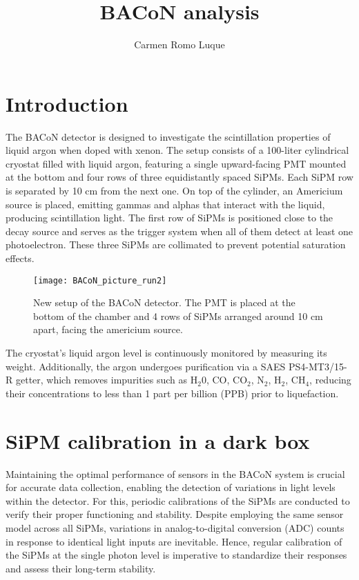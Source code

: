 \documentclass[11pt,a4paper,english,oneside, pdf]{article}
\title{BACoN analysis}
\author{Carmen Romo Luque}
\begin{document}
	\maketitle
	
	\section{Introduction}	 
	 The BACoN detector is designed to investigate the scintillation properties of liquid argon when doped with xenon. The setup consists of a 100-liter cylindrical cryostat filled with liquid argon, featuring a single upward-facing PMT mounted at the bottom and four rows of three equidistantly spaced SiPMs. Each SiPM row is separated by 10 cm from the next one. On top of the cylinder, an Americium source is placed, emitting gammas and alphas that interact with the liquid, producing scintillation light. The first row of SiPMs is positioned close to the decay source and serves as the trigger system when all of them detect at least one photoelectron. These three SiPMs are collimated to prevent potential saturation effects.
	 
	 	\begin{figure}[!h]
	 	\begin{center}
	 		\texttt{[image: BACoN\_picture\_run2]}
	 		\caption{New setup of the BACoN detector. The PMT is placed at the bottom of the chamber and 4 rows of SiPMs arranged around 10 cm apart, facing the americium source.}
	 		\label{fig:BACoN_picture_run2}
	 	\end{center}
	 \end{figure}
	 
	 The cryostat's liquid argon level is continuously monitored by measuring its weight. Additionally, the argon undergoes purification via a SAES PS4-MT3/15-R getter, which removes impurities such as H$_2$0, CO, CO$_2$, N$_2$, H$_2$, CH$_4$, reducing their concentrations to less than 1 part per billion (PPB) prior to liquefaction.
	
	\section{SiPM calibration in a dark box}
	\label{cal_dark_box}
	
	Maintaining the optimal performance of sensors in the BACoN system is crucial for accurate data collection, enabling the detection of variations in light levels within the detector. For this, periodic calibrations of the SiPMs are conducted to verify their proper functioning and stability. Despite employing the same sensor model across all SiPMs, variations in analog-to-digital conversion (ADC) counts in response to identical light inputs are inevitable. Hence, regular calibration of the SiPMs at the single photon level is imperative to standardize their responses and assess their long-term stability.
	
\end{document}
